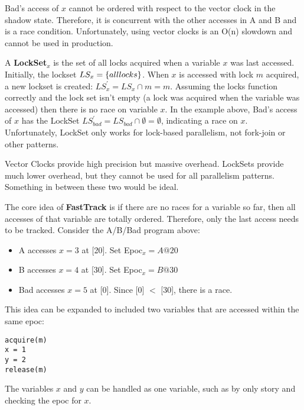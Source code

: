 \documentclass[twoside]{article}
\begin{document}
Bad's access of $x$ cannot be ordered with respect to the vector clock in the
shadow state. Therefore, it is concurrent with the other accesses in A and B and
is a race condition. Unfortunately, using vector clocks is an O(n) slowdown and
cannot be used in production.

A \textbf{LockSet$_x$} is the set of all locks acquired when a variable $x$ was
last accessed. Initially, the lockset $LS_x = {\mathrm\{all locks\}}$. When $x$
is accessed with lock $m$ acquired, a new lockset is created: $LS^\prime _x =
LS_x \cap {m} = {m}$. Assuming the locks function correctly and the lock set
isn't empty (a lock was acquired when the variable was accessed) then there is
no race on variable $x$. In the example above, Bad's access of $x$ has the
LockSet $LS^\prime _{bad} = LS_{bad} \cap \emptyset = \emptyset$, indicating a
race on $x$.  Unfortunately, LockSet only works for lock-based parallelism, not
fork-join or other patterns.

Vector Clocks provide high precision but massive overhead. LockSets provide
much lower overhead, but they cannot be used for all parallelism patterns.
Something in between these two would be ideal.

The core idea of \textbf{FastTrack} is if there are no races for a variable so
far, then all accesses of that variable are totally ordered. Therefore, only the
last access needs to be tracked. Consider the A/B/Bad program above:

\begin{itemize}
  \item A accesses $x = 3$ at [20]. Set Epoc$_x = A@20$
  \item B accesses $x = 4$ at [30]. Set Epoc$_x = B@30$
  \item Bad accesses $x = 5$ at [0]. Since [0] $<$ [30], there is a race.
\end{itemize}

This idea can be expanded to included two variables that are accessed within the
same epoc:

\begin{verbatim}
acquire(m)
x = 1
y = 2
release(m)
\end{verbatim}

The variables $x$ and $y$ can be handled as one variable, such as by only story
and checking the epoc for $x$.
\end{document}
